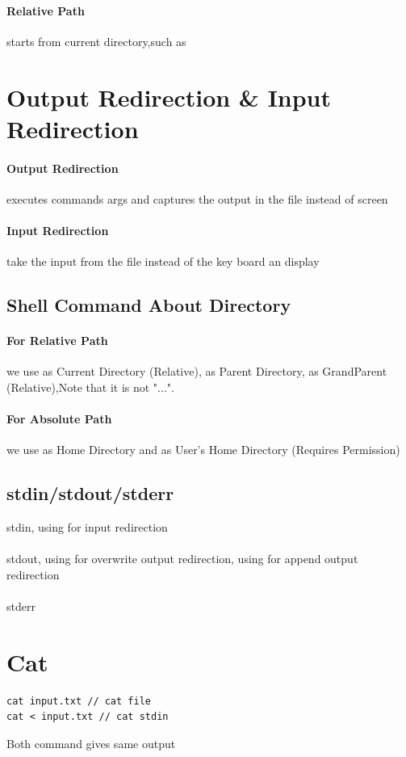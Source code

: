 \documentclass{report}
\begin{document}
\paragraph{Relative Path} starts from current directory,such as 

\section{Output Redirection \& Input Redirection}
\paragraph{Output Redirection} executes commands args and captures the output in the file instead of screen
\paragraph{Input Redirection} take the input from the file instead of the key board an display
\subsection{Shell Command About Directory}
\paragraph{For Relative Path} we use  as Current Directory (Relative), as Parent Directory,  as GrandParent (Relative),{\tiny Note that it is not "..."}.
\paragraph{For Absolute Path} we use \ibx{$\sim$} as Home Directory and  as User's Home Directory (Requires Permission)

\subsection{stdin/stdout/stderr}
 stdin, using \ibx{$<$} for input redirection\\\\
 stdout, using \ibx{$>$} for overwrite output redirection, using \ibx{$>>$} for append output redirection\\\\
 stderr
\section{Cat}
\begin{lstlisting}
cat input.txt // cat file
cat < input.txt // cat stdin
\end{lstlisting}
Both command gives same output
\end{document}
